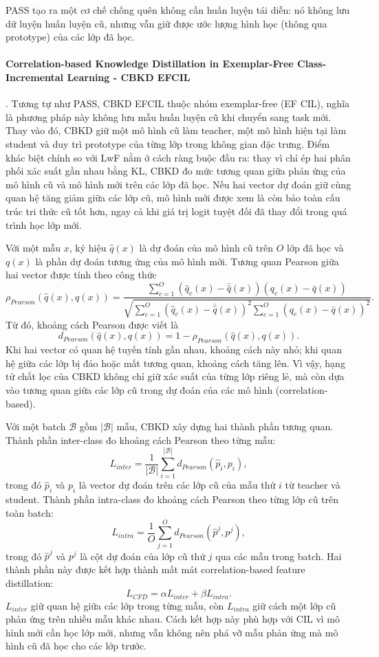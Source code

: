 PASS tạo ra một cơ chế chống quên không cần huấn luyện tái diễn: nó không lưu dữ luyện huấn luyện cũ, nhưng vẫn giữ được ước lượng hình học (thông qua prototype) của các lớp đã học.

\paragraph{Correlation-based Knowledge Distillation in Exemplar-Free Class-Incremental Learning - CBKD EFCIL} \cite{gao2025cbkdefcil}. Tương tự như PASS, CBKD EFCIL thuộc nhóm exemplar-free (EF CIL), nghĩa là phương pháp này không lưu mẫu huấn luyện cũ khi chuyển sang task mới. Thay vào đó, CBKD giữ một mô hình cũ làm teacher, một mô hình hiện tại làm student và duy trì prototype của từng lớp trong không gian đặc trưng. Điểm khác biệt chính so với LwF nằm ở cách ràng buộc đầu ra: thay vì chỉ ép hai phân phối xác suất gần nhau bằng KL, CBKD đo mức tương quan giữa phản ứng của mô hình cũ và mô hình mới trên các lớp đã học. Nếu hai vector dự đoán giữ cùng quan hệ tăng giảm giữa các lớp cũ, mô hình mới được xem là còn bảo toàn cấu trúc tri thức cũ tốt hơn, ngay cả khi giá trị logit tuyệt đối đã thay đổi trong quá trình học lớp mới.

Với một mẫu $x$, ký hiệu $\hat q(x)$ là dự đoán của mô hình cũ trên $O$ lớp đã học và $q(x)$ là phần dự đoán tương ứng của mô hình mới. Tương quan Pearson giữa hai vector được tính theo công thức
$$
\rho_{Pearson}(\hat q(x),q(x))=
\frac{\sum_{c=1}^{O}(\hat q_c(x)-\bar{\hat q}(x))(q_c(x)-\bar q(x))}
{\sqrt{\sum_{c=1}^{O}(\hat q_c(x)-\bar{\hat q}(x))^2
\sum_{c=1}^{O}(q_c(x)-\bar q(x))^2}}.
$$
Từ đó, khoảng cách Pearson được viết là
$$
d_{Pearson}(\hat q(x),q(x))=1-\rho_{Pearson}(\hat q(x),q(x)).
$$
Khi hai vector có quan hệ tuyến tính gần nhau, khoảng cách này nhỏ; khi quan hệ giữa các lớp bị đảo hoặc mất tương quan, khoảng cách tăng lên. Vì vậy, hạng tử chắt lọc của CBKD không chỉ giữ xác suất của từng lớp riêng lẻ, mà còn dựa vào tương quan giữa các lớp cũ trong dự đoán của các mô hình (correlation-based).

Với một batch $\mathcal{B}$ gồm $|\mathcal{B}|$ mẫu, CBKD xây dựng hai thành phần tương quan. Thành phần inter-class đo khoảng cách Pearson theo từng mẫu:
$$
L_{inter}=\frac{1}{|\mathcal{B}|}\sum_{i=1}^{|\mathcal{B}|}d_{Pearson}(\hat p_i,p_i),
$$
trong đó $\hat p_i$ và $p_i$ là vector dự đoán trên các lớp cũ của mẫu thứ $i$ từ teacher và student. Thành phần intra-class đo khoảng cách Pearson theo từng lớp cũ trên toàn batch:
$$
L_{intra}=\frac{1}{O}\sum_{j=1}^{O}d_{Pearson}(\hat p^j,p^j),
$$
trong đó $\hat p^j$ và $p^j$ là cột dự đoán của lớp cũ thứ $j$ qua các mẫu trong batch. Hai thành phần này được kết hợp thành mất mát correlation-based feature distillation:
$$
L_{CFD}=\alpha L_{inter}+\beta L_{intra}.
$$
$L_{inter}$ giữ quan hệ giữa các lớp trong từng mẫu, còn $L_{intra}$ giữ cách một lớp cũ phản ứng trên nhiều mẫu khác nhau. Cách kết hợp này phù hợp với CIL vì mô hình mới cần học lớp mới, nhưng vẫn không nên phá vỡ mẫu phản ứng mà mô hình cũ đã học cho các lớp trước.


